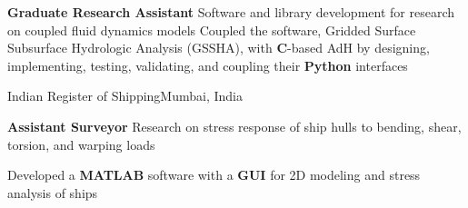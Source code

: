 \documentclass[letterpaper,10pt]{article}
\begin{document}
      \resumeSubSubheading
       {\textbf{Graduate Research Assistant}}{}
       \resumeItemListStart
            {Software and library development for research on coupled
            fluid dynamics models}
            {Coupled the \textbf{\CC{}} software, Gridded Surface Subsurface
            Hydrologic Analysis (GSSHA), with \textbf{C}-based AdH by
            designing, implementing, testing, validating, and coupling their
            \textbf{Python} interfaces}
       \resumeItemListEnd

    \resumeSubheading
      {Indian Register of Shipping}{Mumbai, India}

      \resumeSubSubheading
        {\textbf{Assistant Surveyor}}{}
        \resumeItemListStart
            {Research on stress response of ship hulls to bending, shear,
            torsion, and warping loads}

            {Developed a \textbf{MATLAB} software with a \textbf{GUI} for 2D
            modeling and stress analysis of ships}
        \resumeItemListEnd



\end{document}
